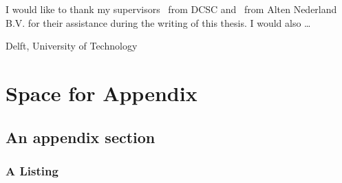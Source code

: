 \documentclass[a4paper,11pt]{mscThesis}
\begin{document}
%
\frontmatter %
%
 \maketitle
%

%
    I would like to thank my supervisors \mscreaderone\ from DCSC and \mscreadertwo\ from Alten Nederland B.V. for their assistance during the writing
    of this thesis. I would also \ldots 
    \vspace*{15mm}

    \noindent
    Delft, University of Technology \hfill \mscname\\
    \mscdate

%
    \tocloflot
%
    
    \cleardoublepage%
%
%
\mainmatter
%
%
%









%


	
\appendix
    \chapter{Space for Appendix}
    \section{An appendix section}

    \subsection{A \matlab Listing}

    \lstset{language=matlab}
    
    
%
%        
\end{document}
